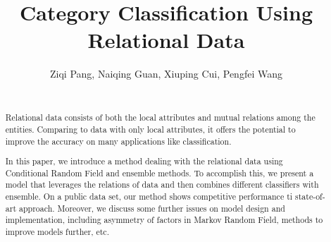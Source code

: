 \documentclass{sig-alternate}
\begin{document}
\title{Category Classification Using Relational Data}
%
%
%
%
%

%
\author{
%
%
\alignauthor
Ziqi Pang, Naiqing Guan, Xiuping Cui, Pengfei Wang\\
       \\
}

\maketitle
\begin{abstract}
Relational data consists of both the local attributes and mutual relations among the entities. Comparing to data with only local attributes, it offers the potential to improve the accuracy on many applications like classification.

In this paper, we introduce a method dealing with the relational data using Conditional Random Field and ensemble methods. To accomplish this, we present a model that leverages the relations of data and then combines different classifiers with ensemble. On a public data set, our method shows competitive performance ti state-of-art approach. Moreover, we discuss some further issues on model design and implementation, including asymmetry of factors in Markov Random Field,  methods to improve models further, etc.
\end{abstract}
\end{document}
